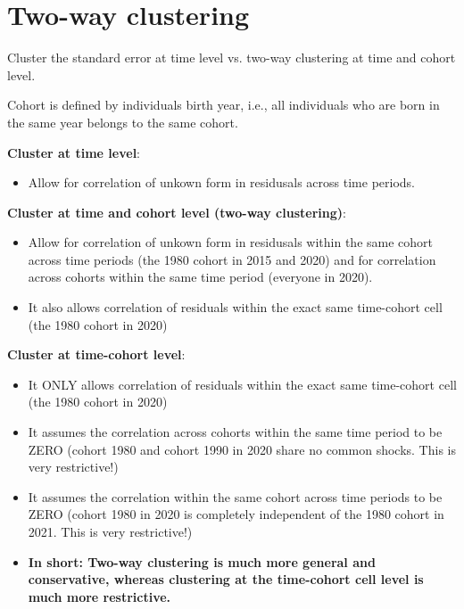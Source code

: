 \documentclass[10pt]{article}
\title{}
\author{}
\date{}
\begin{document}
\maketitle




\section{Two-way clustering}

Cluster the standard error at time level vs. two-way clustering at time and cohort level.

Cohort is defined by individuals birth year, i.e., all individuals who are born in the same year
belongs to the same cohort.


{\textbf {Cluster at time level}}:
\begin{itemize}
\item Allow for correlation of unkown form in residusals across time periods.
\end{itemize}


{\textbf {Cluster at time and cohort level (two-way clustering)}}:
\begin{itemize}
\item Allow for correlation of unkown form in residusals within the same cohort across time periods
		(the 1980 cohort in 2015 and 2020) and for correlation across cohorts within the same time 
		period (everyone in 2020).
\item It also allows correlation of residuals within the exact same time-cohort cell (the 1980 cohort in 2020)
\end{itemize}

{\textbf {Cluster at time-cohort level}}:
\begin{itemize}
\item It ONLY allows correlation of residuals within the exact same time-cohort cell (the 1980 cohort in 2020)
\item It assumes the correlation across cohorts within the same time period to be ZERO (cohort 1980 and cohort
		1990 in 2020 share no common shocks. This is very restrictive!)
\item It assumes the correlation within the same cohort across time periods to be ZERO (cohort 1980 in 2020 is
		completely independent of the 1980 cohort in 2021. This is very restrictive!)
\item 
		{\textbf {In short: Two-way clustering is much more general and conservative, whereas clustering at the time-cohort cell level is much more restrictive.}}
\end{itemize}
\end{document}
